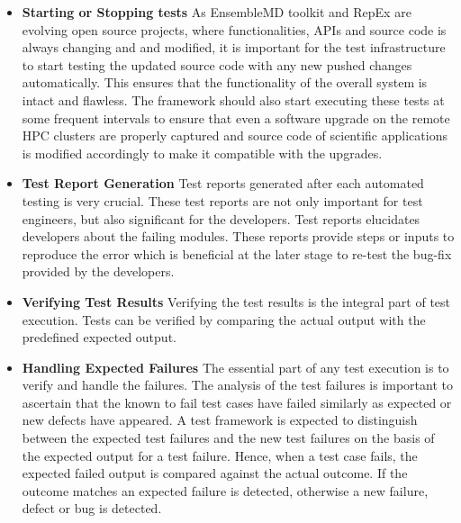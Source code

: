 \documentclass[10pt]{ruthesis}
\begin{document}
\begin{itemize}

\item \textbf{Starting or Stopping tests}\newline
As EnsembleMD toolkit and RepEx are evolving open source projects, where functionalities, APIs and source code is always changing and and modified, it is important for the test infrastructure to start testing the updated source code with any new pushed changes automatically. This ensures that the functionality of the overall system is intact and flawless. The framework should also start executing these tests at some frequent intervals to ensure that even a software upgrade on the remote HPC clusters are properly captured and source code of scientific applications is modified accordingly to make it compatible with the upgrades.

\item \textbf{Test Report Generation}\newline
Test reports generated after each automated testing is very crucial. These test reports are not only important for test engineers, but also significant for the developers. Test reports elucidates developers about the failing modules. These reports provide steps or inputs to reproduce the error which is beneficial at the later stage to re-test the bug-fix provided by the developers. 

\item \textbf{Verifying Test Results}\newline
Verifying the test results is the integral part of test execution. Tests can be verified by comparing the actual output with the predefined expected output.

\item \textbf{Handling Expected Failures}\newline
The essential part of any test execution is to verify and handle the failures. The analysis of the test failures is important to ascertain that the known to fail test cases have failed similarly as expected or new defects have appeared. A test framework is expected to distinguish between the expected test failures and the new test failures on the basis of the expected output for a test failure. Hence, when a test case fails, the expected failed output is compared against the actual outcome. If the outcome matches an expected failure is detected, otherwise a new failure, defect or bug is detected. 

\end{itemize}
\end{document}
